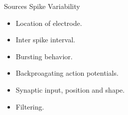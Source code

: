 \documentclass{beamer}
\begin{document}
\begin{frame}{Sources Spike Variability}
    \begin{itemize}
        \item Location of electrode.
        \item Inter spike interval.
        \item Bursting behavior.
        \item Backproagating action potentials.
        \item Synaptic input, position and shape.
        \item Filtering.
    \end{itemize}
\end{frame}
\end{document}
